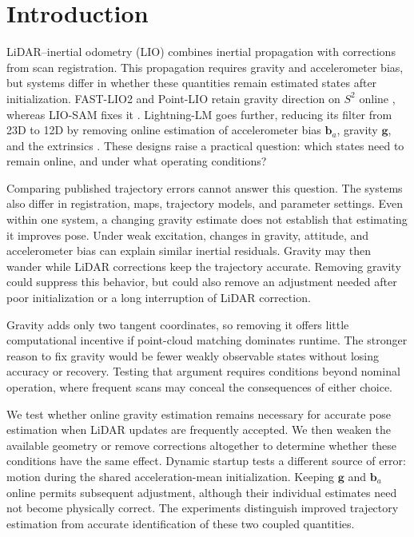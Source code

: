 \section{Introduction}
\label{sec:intro}

LiDAR--inertial odometry (LIO) combines inertial propagation with corrections
from scan registration. This propagation requires gravity and accelerometer
bias, but systems differ in whether these quantities remain estimated states
after initialization. FAST-LIO2 and Point-LIO retain gravity direction on $S^2$ online
\cite{xu2022fastlio2,he2023pointlio}, whereas LIO-SAM fixes it
\cite{shan2020liosam}. Lightning-LM goes further, reducing its filter from
23D to 12D by removing online estimation of accelerometer bias $\mathbf b_a$,
gravity $\mathbf g$, and the extrinsics \cite{gao2026lightninglm}. These designs
raise a practical question: which states need to remain online, and under
what operating conditions?

Comparing published trajectory errors cannot answer this question. The systems
also differ in registration, maps, trajectory models, and parameter settings. Even within
one system, a changing gravity estimate does not establish that estimating it
improves pose. Under weak excitation, changes in gravity, attitude, and
accelerometer bias can explain similar inertial residuals. Gravity may then
wander while LiDAR corrections keep the trajectory accurate. Removing gravity
could suppress this behavior, but could also remove an adjustment needed after
poor initialization or a long interruption of LiDAR correction.

Gravity adds only two tangent coordinates, so removing it offers little
computational incentive if point-cloud matching dominates runtime. The stronger
reason to fix gravity would be fewer weakly observable states without losing
accuracy or recovery. Testing that argument requires conditions beyond nominal
operation, where frequent scans may conceal the consequences of either choice.

We test whether online gravity estimation remains necessary for accurate pose
estimation when LiDAR updates are frequently accepted. We then weaken the available geometry
or remove corrections altogether to determine whether these conditions have
the same effect. Dynamic startup tests a different source of error: motion
during the shared acceleration-mean initialization. Keeping $\mathbf g$ and
$\mathbf b_a$ online permits subsequent adjustment, although their individual
estimates need not become physically correct. The experiments distinguish
improved trajectory estimation from accurate identification of these two
coupled quantities.

